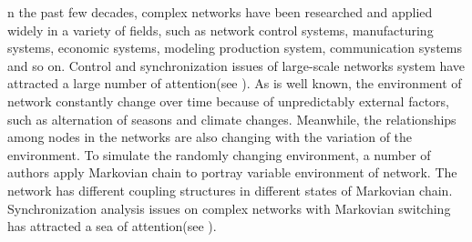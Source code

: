 n the past few decades, complex networks have been researched and applied widely in a variety of fields, such as network control systems, manufacturing systems, economic systems, modeling production system, communication systems and so on. Control and synchronization issues of large-scale networks system have attracted a large number of attention(see \cite{syn4,syn2,syn1,syn3}).
As is well known, the environment of network constantly change over time because of unpredictably external factors, such as alternation of seasons and climate changes. Meanwhile, the relationships among nodes in the networks are also changing with the variation of the environment. To simulate the randomly changing environment, a number of authors apply Markovian chain to portray variable environment of network. The network has different coupling structures in different states of Markovian chain. Synchronization analysis issues on complex networks with Markovian switching has attracted a sea of attention(see \cite{A-nonhomoMarkovian,p10Markovian,p11Markovian,ChenT_event_triggered,A-randomMarkovianDelay,nonlinearly-coupled}). 

